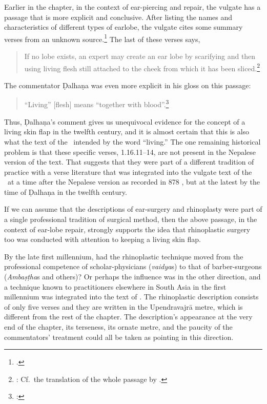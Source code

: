 Earlier in the chapter, in the context of ear-piercing and repair, the vulgate has
a passage that is more explicit and conclusive.  After listing the names and
characteristics of different types of earlobe, the vulgate cites some summary
verses from an unknown source.\footnote{.}  The last of these
    verses says,
    \begin{quote}
            If no lobe exists, an expert may create an ear lobe by scarifying and
then using living flesh still attached to the cheek from which it has
been sliced.\footnote{:  
    Cf.\ the translation of the whole passage by \citet[94]{wuja-2003}.}
    \end{quote}
The commentator Ḍalhaṇa was even more explicit in his gloss on this passage:
\begin{quote}
    “Living” [flesh] means “together with blood”.\footnote{:
    }
\end{quote}
Thus, Ḍalhaṇa's comment gives us unequivocal evidence for the concept of a living
skin flap in the twelfth century, and it is almost certain that this is also what
the text of the \SS\ intended by the word “living.”  The one remaining historical
problem is that these specific verses, 1.16.11--14, are not present in the
Nepalese version of the text.  That suggests that they were part of a different
tradition of practice with a verse literature that was integrated into the vulgate
text of the \SS\ at a time after the Nepalese version as recorded in 878 \CE, but
at the latest by the time of Ḍalhaṇa in the twelfth century.

If we can assume that the descriptions of ear-surgery and rhinoplasty were part of
a single professional tradition of surgical method, then the above passage, in the
context of ear-lobe repair, strongly supports the idea that rhinoplastic surgery
too was conducted with attention to keeping a living skin flap.

By the late first millennium, had the rhinoplastic technique moved from the
professional competence of scholar-physicians (\emph{vaidya}s) to that of
barber-surgeons (\emph{Ambaṣṭha}s and others)?  Or perhaps the influence was in
the other direction, and a technique known to practitioners elsewhere in South
Asia in the first millennium was integrated into the text of \SS. The rhinoplastic
description consists of only five verses and they are written in the Upendravajrā
metre, which is different from the rest of the chapter.  The description's
appearance at the very end of the chapter, its terseness, its ornate metre, and
the paucity of the commentators' treatment could all be taken as pointing in this
direction.


